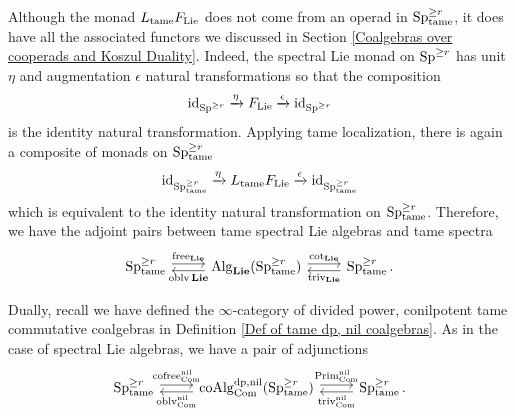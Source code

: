 \begin{remark}
Although the monad $L_{\operatorname{\operatorname{tame}}}F_{\operatorname{Lie}}$ does not come from an operad in $\operatorname{Sp}^{\geq r}_{\operatorname{\operatorname{tame}}}$, it does have all the associated functors we discussed in Section \ref{Coalgebras over cooperads and Koszul Duality}.
Indeed, the spectral Lie monad on $\operatorname{Sp}^{\geq r}$ has unit $\eta$ and augmentation $\epsilon$ natural transformations so that the composition 
\[
\operatorname{id}_{\operatorname{Sp}^{\geq r}}
\xrightarrow{\eta}
F_{\operatorname{Lie}}\xrightarrow{\epsilon}
\operatorname{id}_{\operatorname{Sp}^{\geq r}}
\]
is the identity natural transformation.
Applying tame localization, there is again a composite of monads on $\operatorname{Sp}^{\geq r}_{\operatorname{\operatorname{tame}}}$
\[
\operatorname{id}_{\operatorname{Sp}^{\geq r}_{\operatorname{\operatorname{tame}}}}
\xrightarrow{\eta}
L_{\operatorname{\operatorname{tame}}}F_{\operatorname{Lie}}\xrightarrow{\epsilon}
\operatorname{id}_{\operatorname{Sp}^{\geq r}_{\operatorname{\operatorname{tame}}}}
\]
which is equivalent to the identity natural transformation on $\operatorname{Sp}^{\geq r}_{\operatorname{\operatorname{tame}}}$.
Therefore, we have the adjoint pairs between tame spectral Lie algebras and tame spectra
\[
\begin{tikzcd}
\Sp^{\geq r}_{\tame} & \Alg_{\spLie}(\Sp^{\geq r}_{\tame}) & \Sp^{\geq r}_{\tame}
	\arrow[from=1-1, to= 1-2, shift left = 1, "\Free_{\spLie}" above]
	\arrow[from=1-2, to=1-1, shift left = 1, "\oblv{\spLie}" below]
	\arrow[from=1-2, to= 1-3, shift left = 1, "\cot_{\spLie}" above]
	\arrow[from=1-3, to=1-2, shift left = 1, "\trivial_{\spLie}" below].
\end{tikzcd}
\]
\end{remark}

\begin{remark}
Dually, recall we have defined the $\infty$-category of divided power, conilpotent tame commutative coalgebras in Definition \ref{Def of tame dp, nil coalgebras}. 
As in the case of spectral Lie algebras, we have a pair of adjunctions
\[
\begin{tikzcd}
\Sp^{\geq r}_{\tame} & \coAlg^{\divpow, \nil}_{\Com}(\Sp^{\geq r}_{\tame}) & \Sp^{\geq r}_{\tame}.
	\arrow[from=1-1, to= 1-2, shift left = 1, "\cofree^{\nil}_{\Com}" above]
	\arrow[from=1-2, to=1-1, shift left = 1, "\oblv^{\nil}_{\Com}" below]
	\arrow[from=1-2, to= 1-3, shift left = 1, "\operatorname{Prim}^{\nil}_{\Com}" above]
	\arrow[from=1-3, to=1-2, shift left = 1, "\trivial^{\nil}_{\Com}" below]
\end{tikzcd}
\]
\end{remark}





